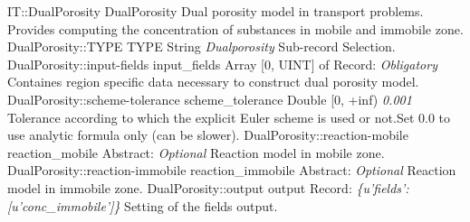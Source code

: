 \begin{RecordType}
	{IT::DualPorosity}
	{DualPorosity}
	{} %
	{} %
	{{{Dual porosity model in transport problems.}\\{
Provides computing the concentration of substances in mobile and immobile zone.}}}
		\RecKey
			{DualPorosity::TYPE}
			{TYPE}
			{{String}}
			{ \it{Dualporosity} }
			{{{Sub-record Selection.}}}
		\RecKey
			{DualPorosity::input-fields}
			{input{\_}fields}
			{{Array [0, UINT] of }{Record}{: }}
			{ \it{Obligatory} }
			{{{Containes region specific data necessary to construct dual porosity model.}}}
		\RecKey
			{DualPorosity::scheme-tolerance}
			{scheme{\_}tolerance}
			{{Double [0, +inf)}}
			{ \it{0.001} }
			{{{Tolerance according to which the explicit Euler scheme is used or not.Set 0.0 to use analytic formula only (can be slower).}}}
		\RecKey
			{DualPorosity::reaction-mobile}
			{reaction{\_}mobile}
			{{Abstract}{: }}
			{ \it{Optional} }
			{{{Reaction model in mobile zone.}}}
		\RecKey
			{DualPorosity::reaction-immobile}
			{reaction{\_}immobile}
			{{Abstract}{: }}
			{ \it{Optional} }
			{{{Reaction model in immobile zone.}}}
		\RecKey
			{DualPorosity::output}
			{output}
			{{Record}{: }}
			{ \it{{\{}u'fields': [u'conc{\_}immobile']{\}}} }
			{{{Setting of the fields output.}}}
\end{RecordType}
